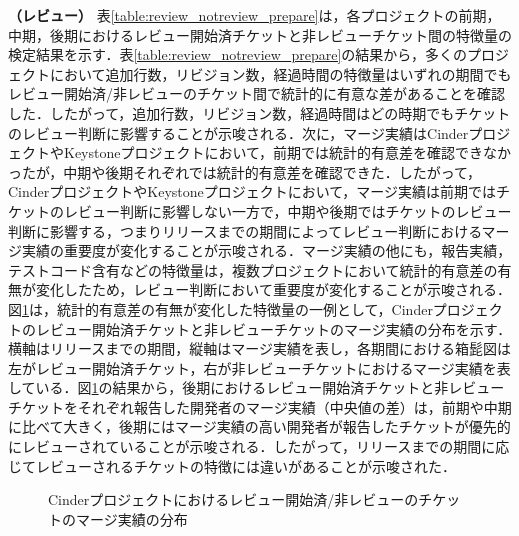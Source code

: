 \documentclass[11pt]{jreport}
\begin{document}
\textbf{（レビュー）} 表\ref{table:review_notreview_prepare}は，各プロジェクトの前期，中期，後期におけるレビュー開始済チケットと非レビューチケット間の特徴量の検定結果を示す．表\ref{table:review_notreview_prepare}の結果から，多くのプロジェクトにおいて追加行数，リビジョン数，経過時間の特徴量はいずれの期間でもレビュー開始済/非レビューのチケット間で統計的に有意な差があることを確認した．したがって，追加行数，リビジョン数，経過時間はどの時期でもチケットのレビュー判断に影響することが示唆される．次に，マージ実績はCinderプロジェクトやKeystoneプロジェクトにおいて，前期では統計的有意差を確認できなかったが，中期や後期それぞれでは統計的有意差を確認できた．したがって，CinderプロジェクトやKeystoneプロジェクトにおいて，マージ実績は前期ではチケットのレビュー判断に影響しない一方で，中期や後期ではチケットのレビュー判断に影響する，つまりリリースまでの期間によってレビュー判断におけるマージ実績の重要度が変化することが示唆される．マージ実績の他にも，報告実績，テストコード含有などの特徴量は，複数プロジェクトにおいて統計的有意差の有無が変化したため，レビュー判断において重要度が変化することが示唆される．
図\ref{fig:review_notreview}は，統計的有意差の有無が変化した特徴量の一例として，Cinderプロジェクトのレビュー開始済チケットと非レビューチケットのマージ実績の分布を示す．横軸はリリースまでの期間，縦軸はマージ実績を表し，各期間における箱髭図は左がレビュー開始済チケット，右が非レビューチケットにおけるマージ実績を表している．図\ref{fig:review_notreview}の結果から，後期におけるレビュー開始済チケットと非レビューチケットをそれぞれ報告した開発者のマージ実績（中央値の差）は，前期や中期に比べて大きく，後期にはマージ実績の高い開発者が報告したチケットが優先的にレビューされていることが示唆される．したがって，リリースまでの期間に応じてレビューされるチケットの特徴には違いがあることが示唆された．


\begin{figure}[h]
\begin{center}
\caption{Cinderプロジェクトにおけるレビュー開始済/非レビューのチケットのマージ実績の分布}
\label{fig:review_notreview}
\end{center}
\end{figure}
\end{document}
